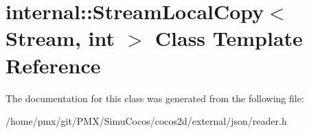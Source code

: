 \hypertarget{classinternal_1_1StreamLocalCopy}{}\section{internal\+:\+:Stream\+Local\+Copy$<$ Stream, int $>$ Class Template Reference}
\label{classinternal_1_1StreamLocalCopy}


The documentation for this class was generated from the following file\+:\begin{DoxyCompactItemize}
\item 
/home/pmx/git/\+P\+M\+X/\+Simu\+Cocos/cocos2d/external/json/reader.\+h\end{DoxyCompactItemize}

